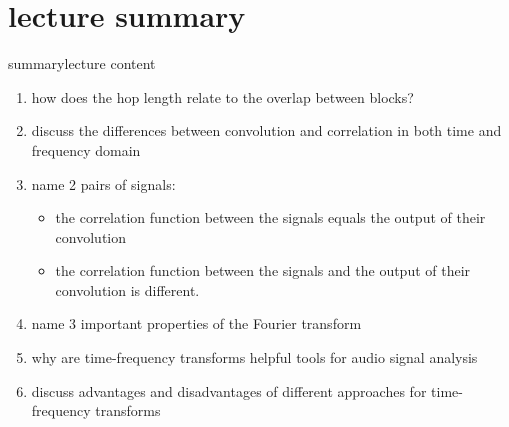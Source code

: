     \section[summary]{lecture summary}
        \begin{frame}{summary}{lecture content}
            \begin{enumerate}
                \item       how does the hop length relate to the overlap between blocks?
                \smallskip
                \item<2->   discuss the differences between convolution and correlation in both time and frequency domain
                \smallskip
                \item<3->   name 2 pairs of signals: 
                    \begin{itemize}
                        \item   the correlation function between the signals equals the output of their convolution
                        \item   the correlation function between the signals and the output of their convolution is different.
                    \end{itemize}
                \smallskip
                \item<4->   name 3 important properties of the Fourier transform
                \smallskip
                \item<5->   why are time-frequency transforms helpful tools for audio signal analysis
                \smallskip
                \item<6->   discuss advantages and disadvantages of different approaches for time-frequency transforms
            \end{enumerate}
        \end{frame}


